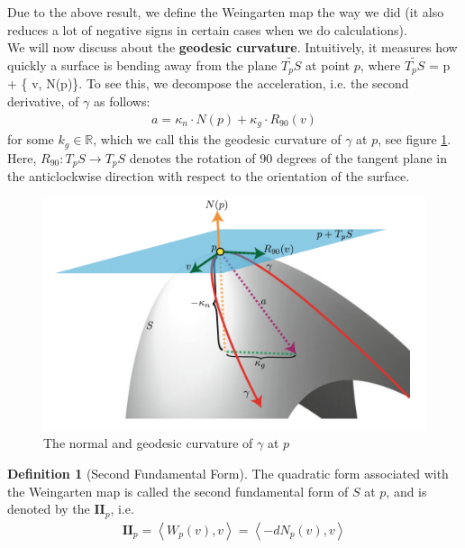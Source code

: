 \documentclass{article}
\theoremstyle{plain}
\theoremstyle{definition}
\newtheorem{definition}{Definition}
\theoremstyle{remark}
\newcommand{\R}{\mathbb{R}}
\begin{document}
Due to the above result, we define the Weingarten map the way we did (it also reduces a lot of negative signs in certain cases when we do calculations). \\
We will now discuss about the \textbf{geodesic curvature}. Intuitively, it measures how quickly a surface is bending away from the plane \( \widetilde{T_pS}\) at point \(p\), where \( \widetilde{T_pS}\) = p + \{ v, N(p)\}. To see this, we decompose the acceleration, i.e. the second derivative, of \( \gamma\) as follows:
\begin{align*}
    a = \kappa_n \cdot N(p) + \kappa_g \cdot R_{90}(v)
\end{align*}
for some \(k_g \in \R\), which we call this the geodesic curvature of \( \gamma\) at \(p\), see figure \ref{fig:normal_and_geodesic_curvature}. Here, \( R_{90}: T_pS \rightarrow T_pS \) denotes the rotation of 90 degrees of the tangent plane in the anticlockwise direction with respect to the orientation of the surface. \\
\begin{figure}[h]
    \centering
    \includegraphics[width=12cm]{./images/normal_and_geodesic_curvature}
    \caption{The normal and geodesic curvature of \(\gamma\) at \(p\)}
    \label{fig:normal_and_geodesic_curvature}
\end{figure}

\begin{definition}[Second Fundamental Form]
    The quadratic form associated with the Weingarten map is called the second fundamental form of \(S\) at \(p\),   and is denoted by the \(\mathbf{II}_p\), i.e.
    \begin{align*}
        \mathbf{II}_p = \left\langle W_p(v), v\right\rangle = \left\langle -dN_p(v), v \right\rangle
    \end{align*}
\end{definition}
\end{document}
